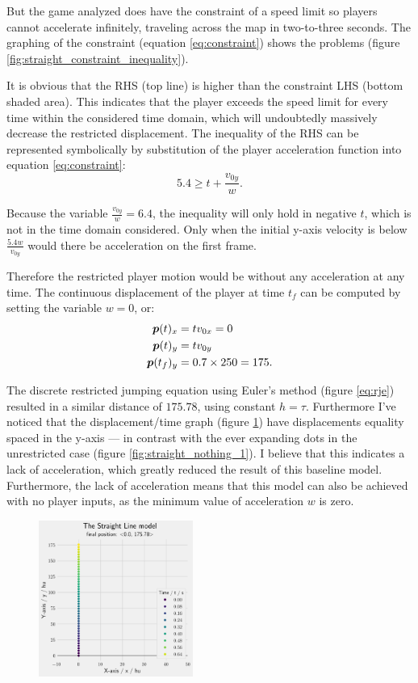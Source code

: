 But the game analyzed does have the constraint of a speed limit so players cannot accelerate infinitely, traveling across the map in two-to-three seconds. The graphing of the constraint (equation \ref{eq:constraint}) shows the problems (figure \ref{fig:straight_constraint_inequality}).

It is obvious that the RHS (top line) is higher than the constraint LHS (bottom shaded area). This indicates that the player exceeds the speed limit for every time within the considered time domain, which will undoubtedly massively decrease the restricted displacement. The inequality of the RHS can be represented symbolically by substitution of the player acceleration function into equation \ref{eq:constraint}:
\[
    5.4 \ge t + \frac{v_{0y}}{w}.
\]

Because the variable $\frac{v_{0y}}{w} = 6.4$, the inequality will only hold in negative $t$, which is not in the time domain considered. Only when the initial y-axis velocity is below $\frac{5.4 w}{v_{0y}}$ would there be acceleration on the first frame.

Therefore the restricted player motion would be without any acceleration at any time. The continuous displacement of the player at time $t_f$ can be computed by setting the variable $w=0$, or:
\begin{align*}
 \boldsymbol{p}(t)_x &= t v_{0x} = 0\\
 \boldsymbol{p}(t)_y &= t v_{0y}\\
 \boldsymbol{p}(t_f)_y &= 0.7 \times 250 = 175.
\end{align*}

The discrete restricted jumping equation using Euler's method (figure \ref{eq:rje}) resulted in a similar distance of $175.78$, using constant $h=\tau$. Furthermore I've noticed that the displacement/time graph (figure \ref{fig:straight_constraint}) have displacements equality spaced in the y-axis --- in contrast with the ever expanding dots in the unrestricted case (figure \ref{fig:straight_nothing_1}). I believe that this indicates a lack of acceleration, which greatly reduced the result of this baseline model. Furthermore, the lack of acceleration means that this model can also be achieved with no player inputs, as the minimum value of acceleration $w$ is zero.

\begin{figure}
    \includegraphics[width=0.45\textwidth,right]{assets/straight_constraint.png}
    \caption{}
    \label{fig:straight_constraint}
\end{figure}

